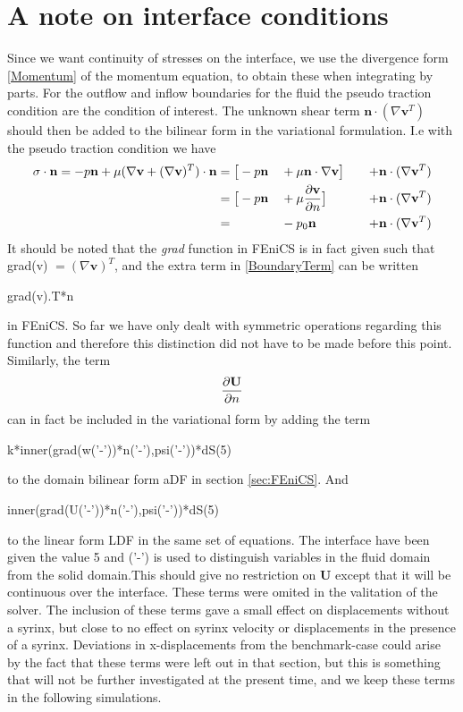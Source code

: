 \clearpage
\section{A note on interface conditions}
Since we want continuity of stresses on the interface, we use the divergence form \eqref{Momentum} of the momentum equation, to obtain these when integrating by parts. For the outflow and inflow boundaries for the fluid the pseudo traction condition are the condition of interest. The unknown shear term $\mathbf{n} \cdot (\nabla \mathbf{v}^T)$ should then be added to the bilinear form in the variational formulation. I.e with the pseudo traction condition we have
\begin{alignat}
\sigma \cdot \mathbf{n} = -p \mathbf{n} + \mu ( \nabla \mathbf{v} + (\nabla \mathbf{v})^T )\cdot \mathbf{n} & = \big{[}-p\mathbf{n} && + \mu \mathbf{n} \cdot \nabla \mathbf{v} \big{]} &&& +\mathbf{n} \cdot (\nabla \mathbf{v} ^T) \\
& = \big{[} -p\mathbf{n} && + \mu \pdi{\mathbf{v}}{n}\big{]} &&& +\mathbf{n} \cdot (\nabla \mathbf{v} ^T) \\
& = && -p_0 \mathbf{n}\ &&& +\mathbf{n} \cdot (\nabla \mathbf{v}^T) \label{BoundaryTerm}
\end{alignat}
It should be noted that the \textit{grad} function in FEniCS is in fact given such that grad(v) $= (\nabla \mathbf{v} )^T$, and the extra term in \eqref{BoundaryTerm} can be written 
\begin{cverbatim}
grad(v).T*n
\end{cverbatim}
in FEniCS. So far we have only dealt with symmetric operations regarding this function and therefore this distinction did not have to be made before this point. 
\\
Similarly, the term
\begin{align}
\frac{\partial \mathbf{U}}{\partial n}
\end{align}
can in fact be included in the variational form by adding the term
\begin{cverbatim}
k*inner(grad(w('-'))*n('-'),psi('-'))*dS(5)
\end{cverbatim}
to the domain bilinear form aDF in section \ref{sec:FEniCS}. And
\begin{cverbatim}
inner(grad(U('-'))*n('-'),psi('-'))*dS(5)
\end{cverbatim}
 to the linear form LDF in the same set of equations. The interface have been given the value 5 and ('-') is used to distinguish variables in the fluid domain from the solid domain.This should give no restriction on $\mathbf{U}$ except that it will be continuous over the interface. These terms were omited in the valitation of the solver. The inclusion of these terms gave a small effect on displacements without a syrinx, but close to no effect on syrinx velocity or displacements in the presence of a syrinx. Deviations in x-displacements from the benchmark-case could arise by the fact that these terms were left out in that section, but this is something that will not be further investigated at the present time, and we keep these terms in the following simulations.
\\
\\
